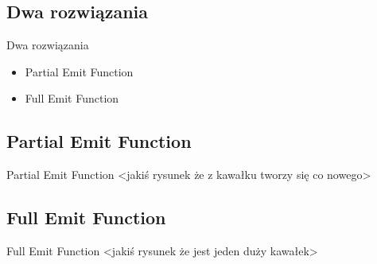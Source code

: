 \documentclass{beamer}
\begin{document}
\subsection*{Dwa rozwiązania}

\begin{frame}{Dwa rozwiązania}
\begin{itemize}
	\item Partial Emit Function
	\item Full Emit Function
\end{itemize}
\end{frame}


\subsection*{Partial Emit Function}

\begin{frame}{Partial Emit Function}
<jakiś rysunek że z kawałku tworzy się co nowego>
\end{frame}


\subsection*{Full Emit Function}

\begin{frame}{Full Emit Function}
<jakiś rysunek że jest jeden duży kawałek>
\end{frame}
\end{document}
